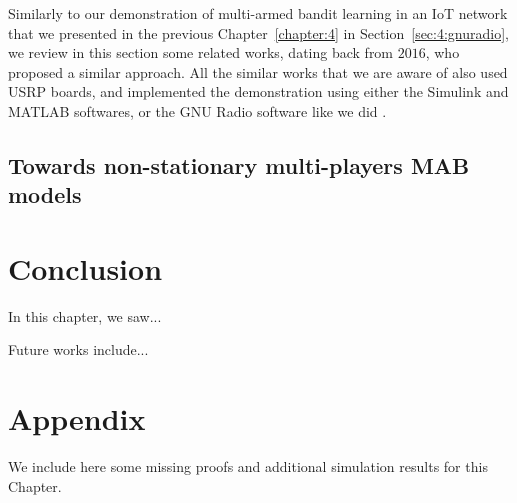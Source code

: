Similarly to our demonstration of multi-armed bandit learning in an IoT network that we presented in the previous Chapter~\ref{chapter:4} in Section~\ref{sec:4:gnuradio},
we review in this section some related works, dating back from $2016$, who proposed a similar approach.
All the similar works that we are aware of also used USRP boards, and implemented the demonstration using either the Simulink and MATLAB softwares, or the GNU Radio software like we did \cite{Besson2018ICT}.



\subsection{Towards non-stationary multi-players MAB models}
\label{sub:5:towardsNonStationaryModels}




\section{Conclusion}
\label{sec:5:conclusion}

In this chapter, we saw...

Future works include...



\section{Appendix}
\label{sec:5:appendix}

We include here some missing proofs and additional simulation results for this Chapter.



